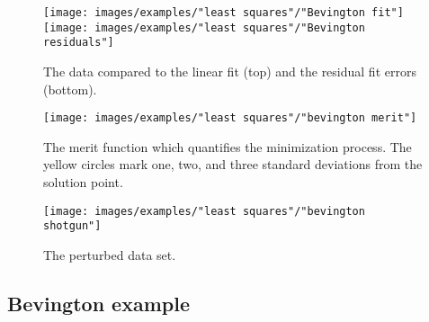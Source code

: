 \begin{figure}[htbp] %
   \centering
   \texttt{[image: images/examples/"least squares"/"Bevington fit"]} \\[40pt]
   \texttt{[image: images/examples/"least squares"/"Bevington residuals"]} 
   \caption{The data compared to the linear fit (top) and the residual fit errors (bottom).}
   \label{fig:Bevington fit and residual errors}
\end{figure}

\begin{figure}[htbp] %
   \centering
   \texttt{[image: images/examples/"least squares"/"bevington merit"]} 
   \caption{The merit function which quantifies the minimization process. The yellow circles mark one, two, and three standard deviations from the solution point.}
   \label{fig:Bevington merit functions}
\end{figure}

\begin{figure}[htbp] %
   \centering
   \texttt{[image: images/examples/"least squares"/"bevington shotgun"]} 
   \caption{The perturbed data set.}
   \label{fig:Bevington perturbed}
\end{figure}

\clearpage

\subsection{Bevington example}


\endinput